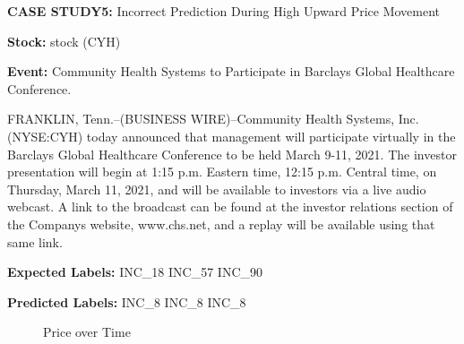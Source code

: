 \documentclass{article}
\begin{document}
\textbf{CASE STUDY5:} Incorrect Prediction During High Upward Price Movement

\textbf{Stock:} stock (CYH)

\textbf{Event:} Community Health Systems to Participate in Barclays Global Healthcare Conference.

FRANKLIN, Tenn.--(BUSINESS WIRE)--Community Health Systems, Inc. (NYSE:CYH) today announced that management will participate virtually in the Barclays Global Healthcare Conference to be held March 9-11, 2021. The investor presentation will begin at 1:15 p.m. Eastern time, 12:15 p.m. Central time, on Thursday, March 11, 2021, and will be available to investors via a live audio webcast. A link to the broadcast can be found at the investor relations section of the Companys website, www.chs.net, and a replay will be available using that same link.

\textbf{Expected Labels:} INC\_18 INC\_57 INC\_90

\textbf{Predicted Labels:} INC\_8 INC\_8 INC\_8

\begin{figure}[h]
    \centering
    \caption{Price over Time}
    \label{fig:price_over_time}
\end{figure}
\end{document}
